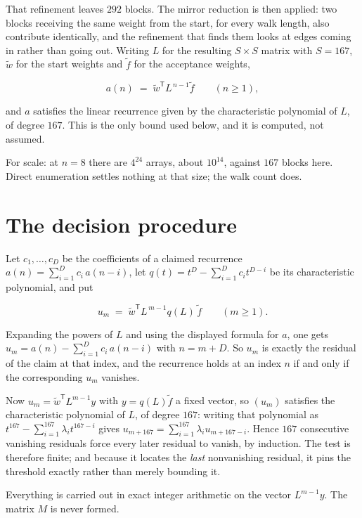 \documentclass[11pt]{article}
\theoremstyle{definition}
\begin{document}
That refinement leaves $292$ blocks. The mirror reduction is then applied: two blocks receiving the same weight from the start, for every walk length, also contribute identically, and the refinement that finds them looks at edges coming in rather than going out. Writing $L$ for the resulting $S \times S$ matrix with $S = 167$, $\tilde w$ for the start weights and $\tilde f$ for the acceptance weights,

\[a(n) \;=\; \tilde w^{\mathsf T} L^{\,n-1} \tilde f \qquad (n \ge 1),\]

and $a$ satisfies the linear recurrence given by the characteristic polynomial of $L$, of degree $167$. This is the only bound used below, and it is computed, not assumed.

For scale: at $n = 8$ there are $4^{24}$ arrays, about $10^{14}$, against $167$ blocks here. Direct enumeration settles nothing at that size; the walk count does.

\section{The decision procedure}

Let $c_1,\dots,c_D$ be the coefficients of a claimed recurrence $a(n) = \sum_{i=1}^{D} c_i\,a(n-i)$, let $q(t) = t^{D} - \sum_{i=1}^{D} c_i t^{D-i}$ be its characteristic polynomial, and put

\[u_m \;=\; \tilde w^{\mathsf T} L^{\,m-1} q(L)\,\tilde f \qquad (m \ge 1).\]

Expanding the powers of $L$ and using the displayed formula for $a$, one gets $u_m = a(n) - \sum_{i=1}^{D} c_i\,a(n-i)$ with $n = m + D$. So $u_m$ is exactly the residual of the claim at that index, and the recurrence holds at an index $n$ if and only if the corresponding $u_m$ vanishes.

Now $u_m = \tilde w^{\mathsf T} L^{m-1} y$ with $y = q(L)\tilde f$ a fixed vector, so $(u_m)$ satisfies the characteristic polynomial of $L$, of degree $167$: writing that polynomial as $t^{167} - \sum_{i=1}^{167} \lambda_i t^{167-i}$ gives $u_{m+167} = \sum_{i=1}^{167} \lambda_i u_{m+167-i}$. Hence $167$ consecutive vanishing residuals force every later residual to vanish, by induction. The test is therefore finite; and because it locates the {\itshape last} nonvanishing residual, it pins the threshold exactly rather than merely bounding it.

Everything is carried out in exact integer arithmetic on the vector $L^{m-1}y$. The matrix $M$ is never formed.
\end{document}
